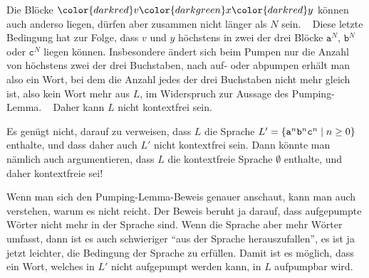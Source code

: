 \begin{loesung}
\begin{center}
\end{center}
Die Blöcke ${\color{darkred}v}{\color{darkgreen}x}{\color{darkred}y}$
können auch anderso liegen, dürfen aber zusammen nicht länger als $N$ sein.
~%
Diese letzte Bedingung hat zur Folge, dass $v$ und $y$ höchstens in
zwei der drei Blöcke $\texttt{a}^N$, $\texttt{b}^N$ oder $\texttt{c}^N$
liegen können.
Insbesondere ändert sich beim Pumpen nur die Anzahl von höchstens zwei der drei
Buchstaben, nach auf- oder abpumpen erhält man also ein Wort, bei dem 
die Anzahl jedes der drei Buchstaben nicht mehr gleich ist, also kein
Wort mehr aus $L$, im Widerspruch zur Aussage des Pumping-Lemma.
~%
Daher kann $L$ nicht kontextfrei sein.
\end{loesung}

\begin{diskussion}
Es genügt nicht, darauf zu verweisen, dass $L$ die Sprache
$L'
=
\{
\texttt{a}\mathstrut^n \texttt{b}\mathstrut^n \texttt{c}\mathstrut^n
\mid n\ge 0
\}$
enthalte, und dass daher auch $L'$ nicht kontextfrei sein.
Dann könnte man nämlich auch argumentieren, dass $L$ die kontextfreie Sprache
$\emptyset$ enthalte, und daher kontextfreie sei!

Wenn man sich den Pumping-Lemma-Beweis genauer anschaut, kann man auch verstehen,
warum es nicht reicht. Der Beweis beruht ja darauf, dass aufgepumpte Wörter nicht
mehr in der Sprache sind. Wenn die Sprache aber mehr Wörter umfasst, dann ist
es auch schwieriger ``aus der Sprache herauszufallen'', es ist ja jetzt leichter,
die Bedingung der Sprache zu erfüllen. Damit ist es möglich, dass ein Wort, welches
in $L'$ nicht aufgepumpt werden kann, in $L$ aufpumpbar wird.
\end{diskussion}

